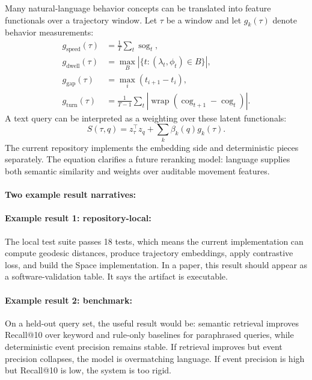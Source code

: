 \documentclass{article}
\begin{document}
Many natural-language behavior concepts can be translated into feature functionals over a trajectory window. Let $\tau$ be a window and let $g_k(\tau)$ denote behavior measurements:
\begin{align}
  g_{\text{speed}}(\tau) &= \frac{1}{T}\sum_t \operatorname{sog}_t,\\
  g_{\text{dwell}}(\tau) &= \max_{B}\left|\{t:(\lambda_t,\phi_t)\in B\}\right|,\\
  g_{\text{gap}}(\tau) &= \max_i(t_{i+1}-t_i),\\
  g_{\text{turn}}(\tau) &= \frac{1}{T-1}\sum_t |\operatorname{wrap}(\operatorname{cog}_{t+1}-\operatorname{cog}_t)|.
\end{align}
A text query can be interpreted as a weighting over these latent functionals:
\begin{equation}
  S(\tau,q)=z_{\tau}^{\top}z_q+\sum_k \beta_k(q)g_k(\tau).
\end{equation}
The current repository implements the embedding side and deterministic pieces separately. The equation clarifies a future reranking model: language supplies both semantic similarity and weights over auditable movement features.

\paragraph{Two example result narratives:}

\paragraph{Example result 1: repository-local:}
The local test suite passes 18 tests, which means the current implementation can compute geodesic distances, produce trajectory embeddings, apply contrastive loss, and build the Space implementation. In a paper, this result should appear as a software-validation table. It says the artifact is executable.

\paragraph{Example result 2: benchmark:}
On a held-out query set, the useful result would be: semantic retrieval improves Recall@10 over keyword and rule-only baselines for paraphrased queries, while deterministic event precision remains stable. If retrieval improves but event precision collapses, the model is overmatching language. If event precision is high but Recall@10 is low, the system is too rigid.
\end{document}
